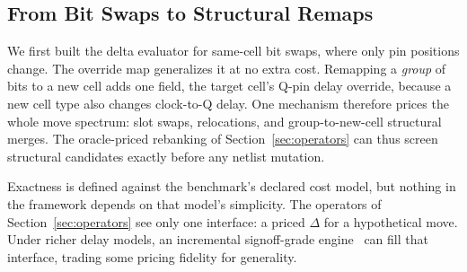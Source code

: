 \subsection{From Bit Swaps to Structural Remaps}
\label{sec:oracle:remaps}

We first built the delta evaluator for same-cell bit swaps, where only pin positions change. The override map generalizes it at no extra cost. Remapping a \emph{group} of bits to a new cell adds one field, the target cell's Q-pin delay override, because a new cell type also changes clock-to-Q delay. One mechanism therefore prices the whole move spectrum: slot swaps, relocations, and group-to-new-cell structural merges. The oracle-priced rebanking of Section~\ref{sec:operators} can thus screen structural candidates exactly before any netlist mutation.

Exactness is defined against the benchmark's declared cost model, but nothing in the framework depends on that model's simplicity. The operators of Section~\ref{sec:operators} see only one interface: a priced $\Delta$ for a hypothetical move. Under richer delay models, an incremental signoff-grade engine~\cite{huang2021opentimer2} can fill that interface, trading some pricing fidelity for generality.
